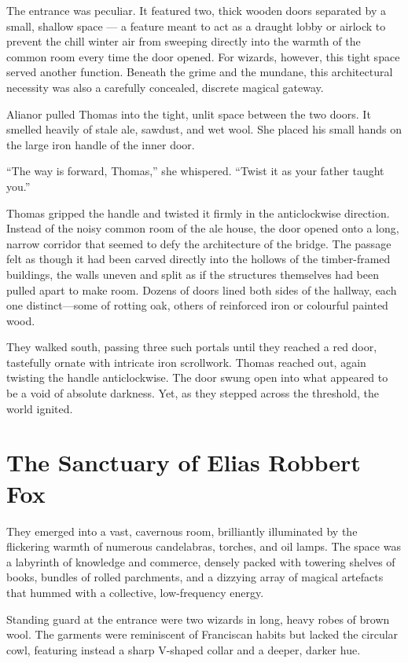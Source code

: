 The entrance was peculiar. It featured two, thick wooden doors separated by a small, shallow space --- a feature meant to act as a draught lobby or airlock to prevent the chill winter air from sweeping directly into the warmth of the common room every time the door opened. For wizards, however, this tight space served another function. Beneath the grime and the mundane, this architectural necessity was also a carefully concealed, discrete magical gateway.

Alianor pulled Thomas into the tight, unlit space between the two doors. It smelled heavily of stale ale, sawdust, and wet wool. She placed his small hands on the large iron handle of the inner door.

\enquote{The way is forward, Thomas,} she whispered. \enquote{Twist it as your father taught you.}

Thomas gripped the handle and twisted it firmly in the anticlockwise direction. Instead of the noisy common room of the ale house, the door opened onto a long, narrow corridor that seemed to defy the architecture of the bridge. The passage felt as though it had been carved directly into the hollows of the timber-framed buildings, the walls uneven and split as if the structures themselves had been pulled apart to make room. Dozens of doors lined both sides of the hallway, each one distinct---some of rotting oak, others of reinforced iron or colourful painted wood.

They walked south, passing three such portals until they reached a red door, tastefully ornate with intricate iron scrollwork. Thomas reached out, again twisting the handle anticlockwise. The door swung open into what appeared to be a void of absolute darkness. Yet, as they stepped across the threshold, the world ignited.

\section*{The Sanctuary of Elias Robbert Fox}

They emerged into a vast, cavernous room, brilliantly illuminated by the flickering warmth of numerous candelabras, torches, and oil lamps. The space was a labyrinth of knowledge and commerce, densely packed with towering shelves of books, bundles of rolled parchments, and a dizzying array of magical artefacts that hummed with a collective, low-frequency energy.

Standing guard at the entrance were two wizards in long, heavy robes of brown wool. The garments were reminiscent of Franciscan habits but lacked the circular cowl, featuring instead a sharp V-shaped collar and a deeper, darker hue.

